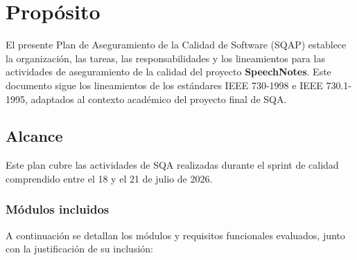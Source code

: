 \chapter{Propósito}
\label{sec:proposito}

El presente Plan de Aseguramiento de la Calidad de Software (SQAP) establece la organización, las tareas, las responsabilidades y los lineamientos para las actividades de aseguramiento de la calidad del proyecto \textbf{SpeechNotes}. Este documento sigue los lineamientos de los estándares IEEE 730-1998 e IEEE 730.1-1995, adaptados al contexto académico del proyecto final de SQA.

\section{Alcance}
\label{sec:alcance}

Este plan cubre las actividades de SQA realizadas durante el sprint de calidad comprendido entre el 18 y el 21 de julio de 2026.

\subsection{Módulos incluidos}
\label{subsec:modulos-incluidos}

A continuación se detallan los módulos y requisitos funcionales evaluados, junto con la justificación de su inclusión:

